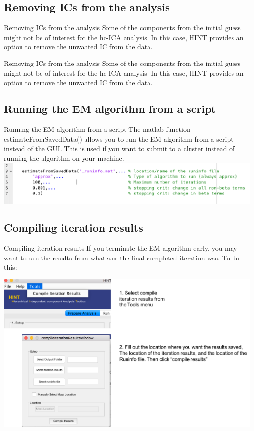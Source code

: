 \documentclass[11pt]{beamer}
\begin{document}
\subsection{Removing ICs from the analysis}
\begin{frame}{Removing ICs from the analysis}
Some of the components from the initial guess might not be of interest for the hc-ICA analysis. In this case, HINT provides an option to remove the unwanted IC from the data. 
\end{frame}

\begin{frame}{Removing ICs from the analysis}
Some of the components from the initial guess might not be of interest for the hc-ICA analysis. In this case, HINT provides an option to remove the unwanted IC from the data. 
\end{frame}

\subsection{Running the EM algorithm from a script}
\begin{frame}{Running the EM algorithm from a script}
The matlab function estimateFromSavedData() allows you to run the EM algorithm from a script instead of the GUI. This is used if you want to submit to a cluster instead of running the algorithm on your machine.
\includegraphics[width=1\linewidth]{figs/scriptVersion}
\end{frame}

\subsection{Compiling iteration results}
\begin{frame}{Compiling iteration results}
If you terminate the EM algorithm early, you may want to use the results from whatever the final completed iteration was. To do this:

\includegraphics[width=1\linewidth]{figs/compileResultsExample}


\end{frame}
\end{document}
